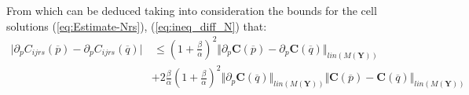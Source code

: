 From which can be deduced taking into consideration the bounds for the cell solutions (\ref{eq:Estimate-Nrs}), (\ref{eq:ineq_diff_N}) that:
\begin{equation}
    \label{EstimateDiffDeriv}
    \begin{aligned}
        \vert \partial_p C_{ijrs}(\overline{p}) - \partial_p C_{ijrs}(\overline{q}) \vert & \,  \leq (1+ \frac{\beta}{\alpha})^2\Vert \partial_p \mathbf{C}(\overline{p}) - \partial_p \mathbf{C}(\overline{q}) \Vert_{lin(M(\mathbf{Y}))} \\
        & + 2\frac{\beta}{\alpha}(1+\frac{\beta}{\alpha})^2 \Vert \partial_p \mathbf{C}(\overline{q}) \Vert_{lin(M(\mathbf{Y}))} \Vert \mathbf{C}(\overline{p}) - \mathbf{C}(\overline{q}) \Vert_{lin(M(\mathbf{Y}))}
    \end{aligned}
\end{equation}


